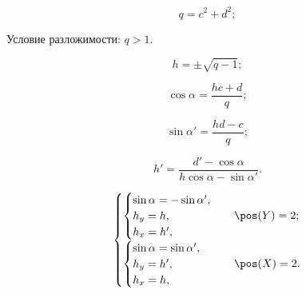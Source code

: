 $$q = c^2 + d^2;$$

Условие разложимости: $q > 1$.

$$h = \pm \sqrt{q - 1};$$

$$\cos\alpha = \frac{h c + d}{q};$$

$$\sin\alpha' = \frac{h d - c}{q};$$

$$h' = \frac{d' - \cos\alpha}{h \cos\alpha - \sin\alpha'}.$$

$$\begin{cases}
	\begin{cases}
		\sin\alpha = -\sin\alpha',\\
		h_y = h,\\
		h_x = h',\\
	\end{cases} & \pos(Y) = 2; \\
	\begin{cases}
		\sin\alpha = \sin\alpha',\\
		h_y = h',\\
		h_x = h,\\
	\end{cases} & \pos(X) = 2. \\
\end{cases}$$